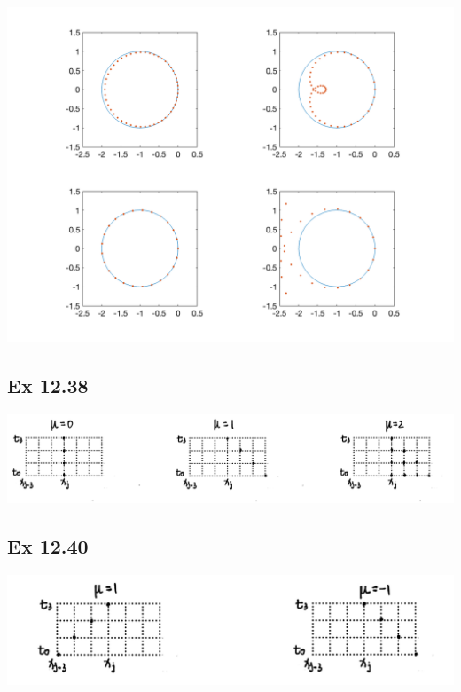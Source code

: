\documentclass{article}
\begin{document}
\includegraphics[scale=0.45]{Ex34.png}

\subsection{Ex 12.38}
\includegraphics[scale=0.25]{Ex38.png}

\subsection{Ex 12.40}
\includegraphics[scale=0.25]{Ex40.png}
\end{document}
